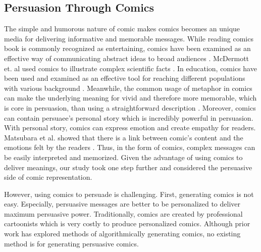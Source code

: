 \subsection{Persuasion Through Comics}
The simple and humorous nature of comic makes comics becomes an unique media for delivering informative and memorable messages. While reading comics book is commonly recognized as entertaining, comics have been examined as an effective way of communicating abstract ideas to broad audiences \cite{McDermottPB18,cary2004going,scott1993understanding}. McDermott et. al used comics to illustrate complex scientific facts \cite{McDermottPB18}. In education, comics have been used and examined as an effective tool for reaching different populations with various background \cite{McDermottPB18,cary2004going,scott1993understanding}. Meanwhile, the common usage of metaphor in comics can make the underlying meaning for vivid and therefore more memorable, which is core in persuasion, than using a straightforward description \cite{McDermottPB18,scott1993understanding}.
Moreover, comics can contain persuaee's personal story which is incredibly powerful in persuasion\cite{weaver2017losing}.
With personal story, comics can express emotion and create empathy for readers. Matsubara et al. showed that there is a link between comic's content and the emotions felt by the readers \cite{matsubara2016emotional}. Thus, in the form of comics, complex messages can be easily interpreted and memorized. Given the advantage of using comics to deliver meanings, our study took one step further and considered the persuasive side of comic representation. \par
However, using comics to persuade is challenging. First, generating comics is not easy. Especially, persuasive messages are better to be personalized to deliver maximum persuasive power. Traditionally, comics are created by professional cartoonists which is very costly to produce personalized comics.  Although prior work has explored methods of algorithmically generating comics, no existing method is for generating persuasive comics. \par
